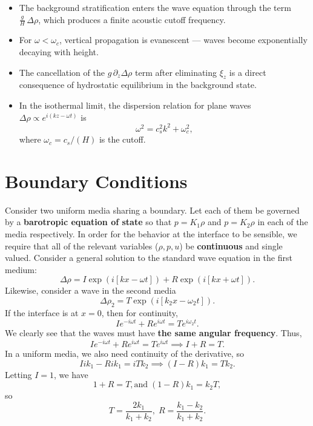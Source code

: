 \begin{itemize}
\item The background stratification enters the wave equation through the term $\frac{g}{H}\,\Delta\rho$, which produces a finite acoustic cutoff frequency.
\item For $\omega < \omega_c$, vertical propagation is evanescent — waves become exponentially decaying with height.
\item The cancellation of the $g\,\partial_z\Delta\rho$ term after eliminating $\xi_z$ is a direct consequence of hydrostatic equilibrium in the background state.
\item In the isothermal limit, the dispersion relation for plane waves $\Delta\rho \propto e^{i(kz-\omega t)}$ is
\[
\omega^2 = c_s^2 k^2 + \omega_c^2,
\]
where $\omega_c = c_s/(H)$ is the cutoff.
\end{itemize}

\section{Boundary Conditions}
Consider two uniform media sharing a boundary. Let each of them be governed by a \textbf{barotropic equation of state} so that $p = K_1\rho$ and $p = K_2 \rho$ in each of the media respectively. In order for the behavior at the interface to be sensible, we require that all of the relevant variables ($\rho, p, u$) be \textbf{continuous} and single valued. Consider a general solution to the standard wave equation in the first medium:
\[
\Delta \rho = I \exp(i[kx-\omega t]) + R\exp(i[kx+\omega t]).
\]
Likewise, consider a wave in the second media 
\[
\Delta \rho_2 = T \exp(i[k_2x-\omega_2t]).
\]
If the interface is at $x=0$, then for continuity,
\[
I e^{-i\omega t} + Re^{i\omega t} = Te^{i\omega_2t}.
\]
We clearly see that the waves must have \textbf{the same angular frequency}. Thus,
\[
Ie^{-i\omega t} + Re^{i\omega t} = Te^{i\omega t} \implies I + R = T.
\]
In a uniform media, we also need continuity of the derivative, so
\[
Iik_1 -Rik_1 = iTk_2 \implies (I-R)k_1 = Tk_2.
\]
Letting $I = 1$, we have
\[
1+R = T, \text{and}\;(1-R)k_1 = k_2T,
\]
so
\[
T = \frac{2k_1}{k_1+k_2},\; R= \frac{k_1-k_2}{k_1+k_2}.
\]